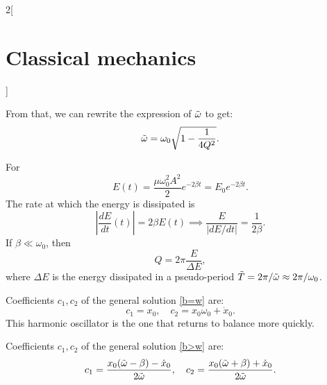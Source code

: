 \documentclass[class=article,10pt,crop=false]{standalone}
\begin{document}
\begin{multicols}{2}[\section{Classical mechanics}]
\begin{definition}
\end{definition}
\noindent From that, we can rewrite the expression of $\Tilde{\omega}$ to get: $$\Tilde{\omega}=\omega_0\sqrt{1-\frac{1}{4Q^2}}.$$
\begin{concept}
For 
$$E(t)=\frac{\mu\omega_0^2A^2}{2}e^{-2\beta t}=E_0e^{-2\beta t}.$$ The rate at which the energy is dissipated is $$\left|\frac{dE}{dt}(t)\right|=2\beta E(t)\implies\frac{E}{\left|dE/dt\right|}=\frac{1}{2\beta}.$$
If $\beta\ll\omega_0$, then $$Q=2\pi\frac{E}{\Delta E},$$ where $\Delta E$ is the energy dissipated in a pseudo-period $\Tilde{T}=2\pi/\Tilde{\omega}\approx2\pi/\omega_0$.
\end{concept}
\begin{concept}[Critically damped harmonic oscillator: $\beta=\omega_0$]
Coefficients $c_1,c_2$ of the general solution \ref{b=w} are: $$c_1=x_0,\quad c_2=x_0\omega_0+\dot{x}_0.$$ This harmonic oscillator is the one that returns to balance more quickly.
\end{concept}
\begin{concept}
Coefficients $c_1,c_2$ of the general solution \ref{b>w} are: $$c_1=\frac{x_0(\Tilde{\omega}-\beta)-\dot{x}_0}{2\Tilde{\omega}},\quad c_2=\frac{x_0(\Tilde{\omega}+\beta)+\dot{x}_0}{2\Tilde{\omega}}.$$
\end{concept}

\end{multicols}
\end{document}

